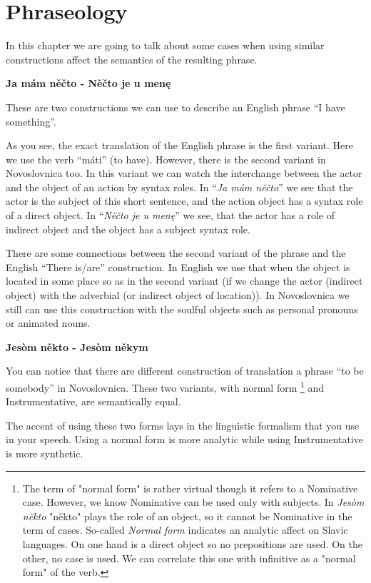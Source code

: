 \section{Phraseology}

In this chapter we are going to talk about some cases when using similar constructions affect the semantics of the resulting phrase.

\textbf{Ja mám něčto - Něčto je u menę}

These are two constructions we can use to describe an English phrase “I have something”.

As you see, the exact translation of the English phrase is the first variant. Here we use the verb “máti” (to have). However, there is the second variant in Novoslovnica too. In this variant we can watch the interchange between the actor and the object of an action by syntax roles. In “\textit{Ja mám něčto}” we see that the actor is the subject of this short sentence, and the action object has a syntax role of a direct object. In “\textit{Něčto je u menę}” we see, that the actor has a role of indirect object and the object has a subject syntax role.    

There are some connections between the second variant of the phrase and the English “There is/are” construction. In English we use that when the object is located in some place so as in the second variant (if we change the actor (indirect object) with the adverbial (or indirect object of location)). In Novoslovnica we still can use this construction with the soulful objects such as personal pronouns or animated nouns. 

\textbf{Jesòm někto - Jesòm někym}

You can notice that there are different construction of translation a phrase “to be somebody” in Novoslovnica. These two variants, with normal form \footnote{The term of "normal form" is rather virtual though it refers to a Nominative case. However, we know Nominative can be used only with subjects. In \textit{Jesòm někto} "někto" plays the role of an object, so it cannot be Nominative in the term of cases. So-called \textit{Normal form} indicates an analytic affect on Slavic languages. On one hand is a direct object so no prepositions are used. On the other, no case is used. We can correlate this one with infinitive as a "normal form" of the verb.} and Instrumentative, are semantically equal. 

The accent of using these two forms lays in the linguistic formalism that you use in your speech. Using a normal form is more analytic while using Instrumentative is more synthetic.

